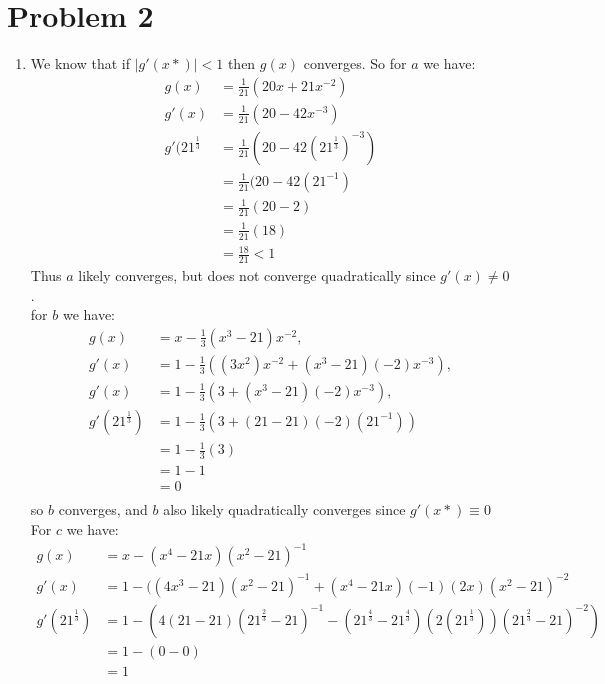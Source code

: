 \documentclass{article}
\begin{document}
\section*{Problem 2}
\begin{enumerate}
\item We know that if $|g'(x*)| < 1$ then $g(x)$ converges. So for $a$ we have:\\
\begin{align*}
g(x) &= \frac{1}{21}(20x + 21x^{-2})\\
g'(x) &= \frac{1}{21}(20 - 42x^{-3}) \\
g'(21^{\frac{1}{3}} &= \frac{1}{21}(20 - 42(21^{\frac{1}{3}})^{-3}) \\
&=  \frac{1}{21}(20 - 42(21^{-1}) \\
&= \frac{1}{21}(20 - 2) \\
&= \frac{1}{21}(18) \\
&= \frac{18}{21} < 1
\end{align*}
Thus $a$ likely converges, but does not converge quadratically since $g'(x) \neq 0$. \\
for $b$ we have: \\
\begin{align*}
g(x) &= x - \frac{1}{3}(x^3 - 21)x^{-2}, \\
g'(x) &= 1 - \frac{1}{3}((3x^2)x^{-2} + (x^3 - 21)(-2)x^{-3}), \\
g'(x) &= 1 - \frac{1}{3}(3 + (x^3 - 21)(-2)x^{-3}), \\
g'(21^{\frac{1}{3}}) &= 1 - \frac{1}{3}(3 + (21 - 21)(-2)(21^{-1})) \\
&= 1 - \frac{1}{3}(3) \\
& = 1 - 1 \\
&= 0 \\
\end{align*}
so $b$ converges, and $b$ also likely quadratically converges since $g'(x*) \equiv 0$\\
For $c$ we have:\\
\begin{align*}
g(x) &= x - (x^4 - 21x)(x^2 - 21)^{-1} \\
g'(x) &= 1 - ((4x^3 - 21)(x^2 - 21)^{-1} + (x^4 - 21x)(-1)(2x)(x^2 - 21)^{-2} \\
g'(21^{\frac{1}{3}})&= 1 - (4(21 - 21)(21^{\frac{2}{3}} - 21)^{-1} - (21^{\frac{4}{3}} - 21^{\frac{4}{3}})(2(21^{\frac{1}{3}}))(21^{\frac{2}{3}} - 21)^{-2}) \\
&= 1 - (0 - 0) \\
&= 1 \\

\end{align*}
\end{enumerate}
\end{document}
